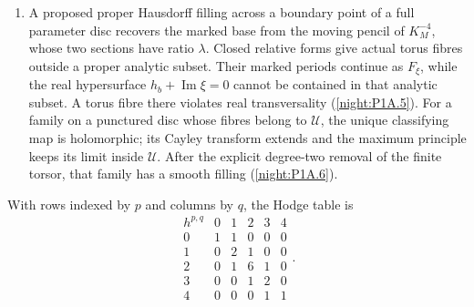 \documentclass[11pt,a4paper]{article}
\theoremstyle{definition}
\begin{document}
\begin{enumerate}[label=\arabic*.]
  by the finite cap norm.  For the other, the actual based cusp
  correction acts on rays by $-P$, and takes $e_2$ to $(0,-1,1)$,
  outside the component's rays $\pm(\{0,1\}^3\setminus\{0\})$.
  The corresponding monomial map contracts a divisor, contradicting
  a biholomorphism (\cref{night:P1.17}).
\item A proposed proper Hausdorff filling across a boundary point of
  a full parameter disc recovers the marked base from the moving
  pencil of $K_M^{-4}$, whose two sections have ratio $\lambda$.
  Closed relative forms give actual torus fibres outside a proper
  analytic subset.  Their marked periods continue as $F_\xi$,
  while the real hypersurface $h_b+\operatorname{Im}\xi=0$
  cannot be contained in that analytic subset.  A torus fibre
  there violates real transversality (\cref{night:P1A.5}).  For a family on a punctured disc whose
  fibres belong to $\mathcal U$, the unique classifying map is
  holomorphic; its Cayley transform extends and the maximum principle
  keeps its limit inside $\mathcal U$.  After the explicit degree-two
  removal of the finite torsor, that family has a smooth filling
  (\cref{night:P1A.6}).
\end{enumerate}

With rows indexed by $p$ and columns by $q$, the Hodge table is
\[
\begin{array}{c|ccccc}
 h^{p,q}&0&1&2&3&4\\\hline
 0&1&1&0&0&0\\
 1&0&2&1&0&0\\
 2&0&1&6&1&0\\
 3&0&0&1&2&0\\
 4&0&0&0&1&1
\end{array}.
\]
\end{document}
